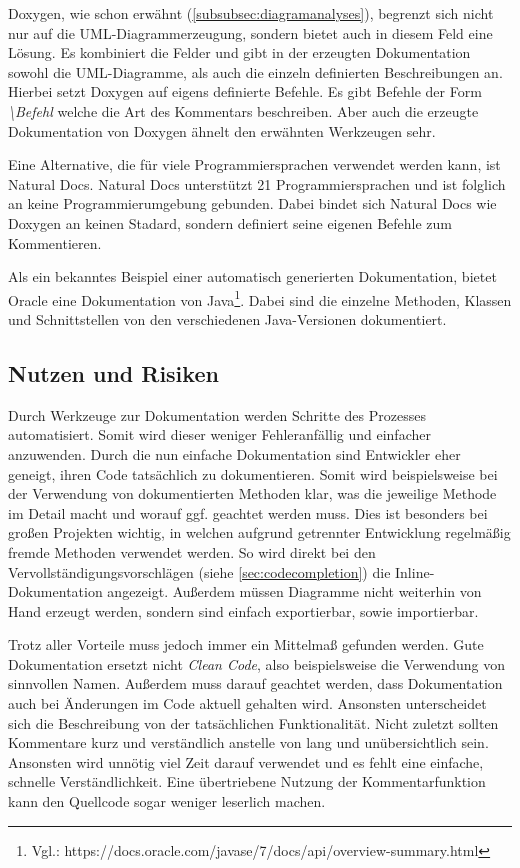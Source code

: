 Doxygen, wie schon erwähnt (\autoref{subsubsec:diagramanalyses}), begrenzt sich nicht nur auf die UML-Diagrammerzeugung, sondern bietet auch in diesem Feld eine Lösung. Es kombiniert die Felder und gibt in der erzeugten Dokumentation sowohl die UML-Diagramme, als auch die einzeln definierten Beschreibungen an. Hierbei setzt Doxygen auf eigens definierte Befehle. Es gibt Befehle der Form \textit{\textbackslash Befehl} welche die Art des Kommentars beschreiben. Aber auch die erzeugte Dokumentation von Doxygen ähnelt den erwähnten Werkzeugen sehr. 

Eine Alternative, die für viele Programmiersprachen verwendet werden kann, ist Natural Docs. Natural Docs unterstützt 21 Programmiersprachen und ist folglich an keine Programmierumgebung gebunden. Dabei bindet sich Natural Docs wie Doxygen an keinen Stadard, sondern definiert seine eigenen Befehle zum Kommentieren.

Als ein bekanntes Beispiel einer automatisch generierten Dokumentation, bietet Oracle eine Dokumentation von Java\footnote{Vgl.: https://docs.oracle.com/javase/7/docs/api/overview-summary.html}. Dabei sind die einzelne Methoden, Klassen und Schnittstellen von den verschiedenen Java-Versionen dokumentiert.  

\subsection{Nutzen und Risiken}
Durch Werkzeuge zur Dokumentation werden Schritte des Prozesses automatisiert. Somit wird dieser weniger Fehleranfällig und einfacher anzuwenden. Durch die nun einfache Dokumentation sind Entwickler eher geneigt, ihren Code tatsächlich zu dokumentieren. Somit wird beispielsweise bei der Verwendung von dokumentierten Methoden klar, was die jeweilige Methode im Detail macht und worauf ggf. geachtet werden muss. Dies ist besonders bei großen Projekten wichtig, in welchen aufgrund getrennter Entwicklung regelmäßig fremde Methoden verwendet werden. So wird direkt bei den Vervollständigungsvorschlägen (siehe \autoref{sec:codecompletion}) die Inline-Dokumentation angezeigt. Außerdem müssen Diagramme nicht weiterhin von Hand erzeugt werden, sondern sind einfach exportierbar, sowie importierbar. 

Trotz aller Vorteile muss jedoch immer ein Mittelmaß gefunden werden. Gute Dokumentation ersetzt nicht \textit{Clean Code}, also beispielsweise die Verwendung von sinnvollen Namen. Außerdem muss darauf geachtet werden, dass Dokumentation auch bei Änderungen im Code aktuell gehalten wird. Ansonsten unterscheidet sich die Beschreibung von der tatsächlichen Funktionalität. Nicht zuletzt sollten Kommentare kurz und verständlich anstelle von lang und unübersichtlich sein. Ansonsten wird unnötig viel Zeit darauf verwendet und es fehlt eine einfache, schnelle Verständlichkeit. Eine übertriebene Nutzung der Kommentarfunktion kann den Quellcode sogar weniger leserlich machen. 

